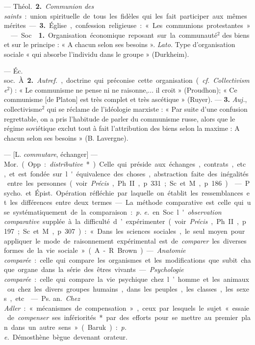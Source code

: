 \begin{itemize}[leftmargin=1cm, label=, itemsep=11pt]
— \si{Théol.} {\bf 2.} {\it Communion des
saints} : union spirituelle de tous les
fidèles qui les fait participer aux
mêmes mérites. — {\bf 3.} Église, confession religieuse : « Les communions
protestantes. »

 — Soc.  {\bf 1.} Organisation économique reposant sur la
communauté$^2$ des biens et sur le
principe : « A chacun selon ses besoins ». {\it Lato.} Type d'organisation
sociale « qui absorbe l’individu dans
le groupe » (Durkheim).

— \si{Éc. soc.} À. {\bf 2.} {\it Autref.}, doctrine
qui préconise cette organisation ({\it cf.} 
{\it Collecti\-visme}$^2$) : « Le communisme
ne pense ni ne raisonne,... il croit »
(Proudhon); « Ce communisme [de
Platon] est très complet et très ascétique » (Ruyer). — {\bf 3.} {\it Auj.}, collectivisme$^2$ qui se réclame de l’idéologie marxiste : « Par suite d’une
confusion regrettable, on a pris
l'habitude de parler du communisme russe, alors que le régime
soviétique exclut tout à fait l’attribution des biens selon la maxime :
A chacun selon ses besoins » (B. Lavergne).

 — [L. {\it commutare},
échanger] — \si{Mor.} (Opp. : {\it distributive}*). Celle qui préside aux échanges,
contrats, etc., et est fondée sur
l'équivalence des choses, abstraction faite des inégalités entre les
personnes (voir {\it Précis}, Ph. II,
p. 331; Sc. et M., p. 186).

 — \si{Psycho.} et \si{Épist.}
Opération réfléchie par laquelle on
établit les ressemblances et les différences entre deux termes. — La méthode comparative est celle qui use
systématiquement de la comparaison : {\it p. e.} en Soc. l'{\it observation comparative} supplée à la difficulté
d’expérimenter (voir {\it Précis}, Ph. II,
p. 197; Sc. et M., p. 307) : « Dans les
sciences sociales, le seul moyen pour
appliquer le mode de raisonnement
expérimental est de {\it comparer} les
diverses formes de la vie sociale »
(A.-R. Brown). — {\it Anatomie comparée} : celle qui compare les organismes et les modifications que
subit chaque organe dans la série
des êtres vivants. — {\it Psychologie
comparée} : celle qui compare la vie
psychique chez l’homme et les animaux ou chez les divers groupes
humains, dans les peuples, les
classes, les sexes, etc.

 — \si{Ps. an.} {\it Chez Adler} :
« mécanismes de compensation »,
ceux par lesquels le sujet « essaie de
{\it compenser} ses infériorités* par des
efforts pour se mettre au premier
plan dans un autre sens » (Baruk) :
{\it p. e.} Démosthène bègue devenant
orateur.


\end{itemize}
